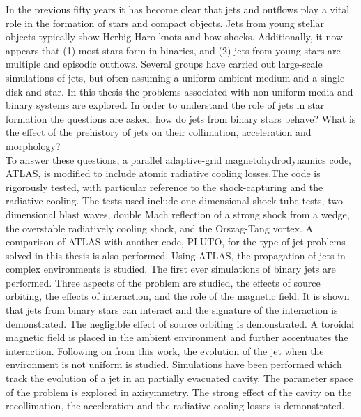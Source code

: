 \summary
{
\def\baselinestretch{1.5}
In the previous fifty years it has become clear that jets and outflows play a vital role in the formation of stars and compact objects. Jets from young stellar objects typically show Herbig-Haro knots and bow shocks.
Additionally, it now appears that (1) most stars form in binaries, and (2) jets from young stars are multiple and episodic outflows.
Several groups have carried out large-scale simulations of jets, but often assuming a uniform ambient medium and a single disk and star.
In this thesis the problems associated with non-uniform media and binary systems are explored.
In order to understand the role of jets in star formation the questions are asked: how do jets from binary stars behave? What is the effect of the prehistory of jets on their collimation, acceleration and morphology?
\\To answer these questions, a parallel adaptive-grid magnetohydrodynamics code, ATLAS, is modified to include atomic radiative cooling losses.The code is rigorously tested, with particular reference to the shock-capturing and the radiative cooling.
The tests used include one-dimensional shock-tube tests, two-dimensional blast waves, double Mach reflection of a strong shock from a wedge, the overstable radiatively cooling shock, and the Orszag-Tang vortex.
A comparison of ATLAS with another code, PLUTO, for the type of jet problems
solved in this thesis is also performed.
Using ATLAS, the propagation of jets in complex environments is studied.
The first ever simulations of binary jets are performed.
Three aspects of the problem are studied, the effects of source orbiting, the effects of interaction, and the role of the magnetic field.
It is shown that jets from binary stars can interact and the signature of the interaction is demonstrated.
The negligible effect of source orbiting is demonstrated.
A toroidal magnetic field is placed in the ambient environment and further accentuates the interaction.
Following on from this work, the evolution of the jet when the environment is not uniform is studied.
Simulations have been performed which track the evolution of a jet in an partially evacuated cavity.
The parameter space of the problem is explored in axisymmetry.
The strong effect of the cavity on the recollimation, the acceleration and the radiative cooling losses is demonstrated.
}
